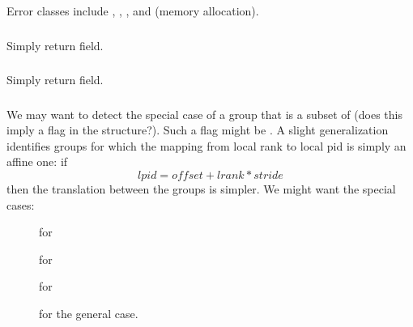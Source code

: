 \documentclass{article}
\begin{document}
Error classes include , , 
, and  (memory allocation). 

\subsubsection{}
Simply return  field.

\subsubsection{}
Simply return  field.

\subsubsection{}
We may want to detect the special case of a group that is a subset of
 (does this imply a flag in the 
structure?).  Such a flag might be
.  A slight generalization
identifies groups for which the mapping from local rank to local pid
is simply an affine one: if 
\[
   lpid = offset + lrank * stride
\]
then the translation between the groups is simpler.  We might want the 
special cases:
\begin{description}
\item[{}] for 
\item[{}] for 
\item[{}] for 
\item[{}] for the general case.
\end{description}
\end{document}
